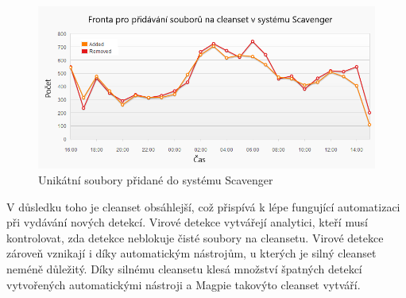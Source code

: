 \documentclass[thesis=M,czech,hidelinks]{FITthesis}[2013/05/06]
\begin{document}
\begin{figure}[h]
	\centering
	\includegraphics[width=12cm]{pictures/scav.png}
	\caption{Unikátní soubory přidané do systému Scavenger}
	\label{fig:scav}
\end{figure}

V důsledku toho je cleanset obsáhlejší, což přispívá k lépe fungující automatizaci při vydávání nových detekcí. Virové detekce vytvářejí analytici, kteří musí kontrolovat, zda detekce neblokuje čisté soubory na cleansetu. Virové detekce zároveň vznikají i díky automatickým nástrojům, u kterých je silný cleanset neméně důležitý. Díky silnému cleansetu klesá množství špatných detekcí vytvořených automatickými nástroji a Magpie takovýto cleanset vytváří.







 \setlength{\parskip}{10pt}
\end{document}
